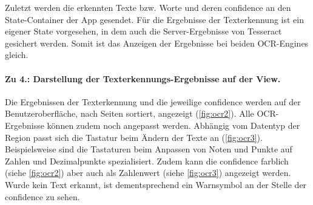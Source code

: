 \documentclass[notables, nomenclature, oneside, 150]{HSMW-Thesis}
\begin{document}
					Zuletzt werden die erkennten Texte bzw. Worte und deren confidence an den State-Container der App gesendet. Für die Ergebnisse der Texterkennung ist ein eigener State vorgesehen, in dem auch die Server-Ergebnisse von Tesseract gesichert werden. Somit ist das Anzeigen der Ergebnisse bei beiden OCR-Engines gleich.  
				
				\paragraph*{Zu 4.: Darstellung der Texterkennungs-Ergebnisse auf der View.}
					Die Ergebnissen der Texterkennung und die jeweilige confidence werden auf der Benutzeroberfläche, nach Seiten sortiert, angezeigt (\ref{fig:ocr2}). Alle OCR-Ergebnisse können zudem noch angepasst werden. Abhängig vom Datentyp der Region passt sich die Tastatur beim Ändern der Texte an (\ref{fig:ocr3}). Beispielsweise sind die Tastaturen beim Anpassen von Noten und Punkte auf Zahlen und Dezimalpunkte spezialisiert. Zudem kann die confidence farblich (siehe \autoref{fig:ocr2}) aber auch als Zahlenwert (siehe \autoref{fig:ocr3}) angezeigt werden. Wurde kein Text erkannt, ist dementsprechend ein Warnsymbol an der Stelle der confidence zu sehen.    
 
\end{document}
